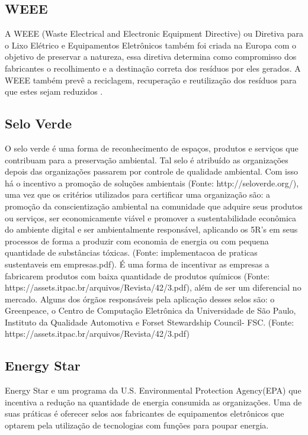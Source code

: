 \subsection{WEEE}

A WEEE (Waste Electrical and Electronic Equipment Directive) ou Diretiva para o Lixo Elétrico e Equipamentos Eletrônicos também foi criada na Europa com o objetivo de preservar a natureza, essa diretiva determina como compromisso dos fabricantes o recolhimento e a destinação correta dos resíduos por eles gerados. A WEEE também prevê a reciclagem, recuperação e reutilização dos resíduos para que estes sejam reduzidos \cite{neto2015ti}.

\subsection{Selo Verde}

O selo verde é uma forma de reconhecimento de espaços, produtos e serviços que contribuam para a preservação ambiental. Tal selo é atribuído as organizações depois das organizações passarem por controle de qualidade ambiental. Com isso há o incentivo a promoção de soluções ambientais (Fonte: http://seloverde.org/), uma vez que os critérios utilizados para certificar uma organização são:  a promoção da conscientização ambiental na comunidade que adquire seus produtos ou serviços, ser economicamente viável e promover a sustentabilidade econômica do ambiente digital e ser ambientalmente responsável, aplicando os 5R’s em seus processos de forma a produzir com economia de energia ou com pequena quantidade de substâncias tóxicas. (Fonte: implementacoa de praticas sustentaveis em empresas.pdf). 
É uma forma de incentivar as empresas a fabricarem produtos com baixa quantidade de produtos químicos (Fonte: https://assets.itpac.br/arquivos/Revista/42/3.pdf), além de ser um diferencial no mercado. Alguns dos órgãos responsáveis pela aplicação desses selos são: o Greenpeace, o Centro de Computação Eletrônica da Universidade de São Paulo, Instituto da Qualidade Automotiva e Forset Stewardship Council- FSC.  (Fonte: https://assets.itpac.br/arquivos/Revista/42/3.pdf)


\subsection{Energy Star}

Energy Star e um programa da U.S. Environmental Protection Agency(EPA) que incentiva a redução na quantidade de energia consumida as organizações. Uma de suas práticas é oferecer selos aos fabricantes de equipamentos eletrônicos que optarem pela utilização de tecnologias com funções para poupar energia.

